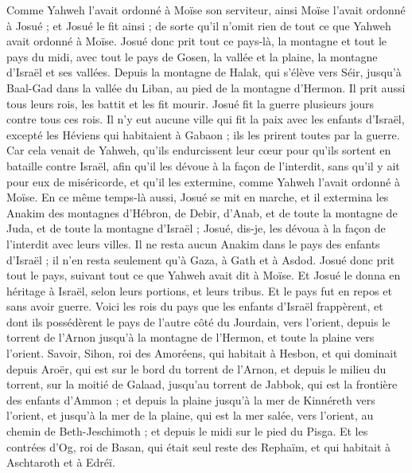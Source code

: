 \begin{multicols}{2}
Comme Yahweh l'avait ordonné à Moïse son serviteur, ainsi Moïse l'avait ordonné à Josué ; et Josué le fit ainsi ; de sorte qu'il n'omit rien de tout ce que Yahweh avait ordonné à Moïse. 
Josué donc prit tout ce pays-là, la montagne et tout le pays du midi, avec tout le pays de Gosen, la vallée et la plaine, la montagne d'Israël et ses vallées.
Depuis la montagne de Halak, qui s'élève vers Séir, jusqu'à Baal-Gad dans la vallée du Liban, au pied de la montagne d'Hermon. Il prit aussi tous leurs rois, les battit et les fit mourir.
 Josué fit la guerre plusieurs jours contre tous ces rois.
Il n'y eut aucune ville qui fit la paix avec les enfants d'Israël, excepté les Héviens qui habitaient à Gabaon ; ils les prirent toutes par la guerre.
Car cela venait de Yahweh, qu'ils endurcissent leur cœur pour qu'ils sortent en bataille contre Israël, afin qu'il les dévoue à la façon de l'interdit, sans qu'il y ait pour eux de miséricorde, et qu'il les extermine, comme Yahweh l'avait ordonné à Moïse.
En ce même temps-là aussi, Josué se mit en marche, et il extermina les Anakim des montagnes d'Hébron, de Debir, d'Anab, et de toute la montagne de Juda, et de toute la montagne d'Israël ; Josué, dis-je, les dévoua à la façon de l'interdit avec leurs villes.
Il ne resta aucun Anakim dans le pays des enfants d'Israël ; il n'en resta seulement qu'à Gaza, à Gath et à Asdod.
Josué donc prit tout le pays, suivant tout ce que Yahweh avait dit à Moïse. Et Josué le donna en héritage à Israël, selon leurs portions, et leurs tribus. Et le pays fut en repos et sans avoir guerre.
\VerseOne{}Voici les rois du pays que les enfants d'Israël frappèrent, et dont ils possédèrent le pays de l'autre côté du Jourdain, vers l'orient, depuis le torrent de l'Arnon jusqu'à la montagne de l'Hermon, et toute la plaine vers l'orient.
Savoir, Sihon, roi des Amoréens, qui habitait à Hesbon, et qui dominait depuis Aroër, qui est sur le bord du torrent de l'Arnon, et depuis le milieu du torrent, sur la moitié de Galaad, jusqu'au torrent de Jabbok, qui est la frontière des enfants d'Ammon ;
et depuis la plaine jusqu'à la mer de Kinnéreth vers l'orient, et jusqu'à la mer de la plaine, qui est la mer salée, vers l'orient, au chemin de Beth-Jeschimoth ; et depuis le midi sur le pied du Pisga.
Et les contrées d'Og, roi de Basan, qui était seul reste des Rephaïm, et qui habitait à Aschtaroth et à Edréï.

\end{multicols}
